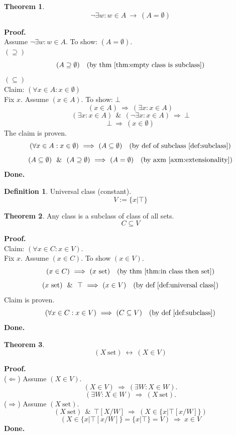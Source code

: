 \documentclass[10pt,a4paper]{article}
\theoremstyle{definition}
\newtheorem{definition}{Definition}[section]
\newtheorem{theorem}{Theorem}[section]
\newcommand{\AND}{\ \ \&\ \ }
\newcommand{\Done}{\noindent \textbf{Done.}\\}
\renewcommand{\iff}{\ \longleftrightarrow\ }
\newcommand{\IMPLIES}{\ \Longrightarrow\ }
\renewcommand{\implies}{\ \longrightarrow\ }
\newcommand{\Proof}{\noindent \textbf{Proof.}\\}
\newcommand{\set}{\mathrm{\ set}}
\newcommand{\comment}[1]{\quad\mbox{(#1)}}
\begin{document}
\begin{theorem}
\[
\neg\exists w: w\in A
\implies
(A=\emptyset)
\]
\end{theorem}
\Proof
Assume $\neg\exists w: w\in A$. To show: $(A=\emptyset)$.\\
$(\supseteq)$\\
\[
(A\supseteq\emptyset)
\quad\mbox{(by thm \ref{thm:empty class is subclass})}
\]
$(\subseteq)$\\
Claim: $(\forall x\in A:x\in\emptyset)$\\
Fix $x$. Assume $(x\in A)$. To show: $\bot$\\
\[
(x\in A)
\IMPLIES
(\exists x:x\in A)
\]
\[
(\exists x:x\in A)
\AND
(\neg\exists x:x\in A)
\IMPLIES
\bot
\]
\[
\bot
\IMPLIES
(x\in\emptyset)
\]
The claim is proven.
\[
(\forall x\in A:x\in\emptyset)
\IMPLIES
(A \subseteq \emptyset)
\comment{by def of subclass \ref{def:subclass}}
\]
\[
(A \subseteq \emptyset)
\AND
(A \supseteq \emptyset)
\IMPLIES
(A=\emptyset)
\comment{by axm \ref{axm:extensionality}}
\]
\Done


\begin{definition} Universal class (constant).
\label{def:universal class}
\[V:=\{x|\top\}\]
\end{definition}
\begin{theorem}
Any class is a subclass of class of all sets.
\[C\subseteq V\]
\end{theorem}
\Proof
Claim: $(\forall x\in C:x\in V)$.\\
Fix $x$. Assume $(x\in C)$. To show $(x\in V)$.
\[
(x\in C)
\IMPLIES
(x\set)
\quad\mbox{(by thm \ref{thm:in class then set})}
\]
\[
(x\set)
\AND
\top
\IMPLIES
(x\in V)
\quad\mbox{(by def \ref{def:universal class})}
\]
Claim is proven.
\[
(\forall x\in C:x\in V)
\IMPLIES
(C\subseteq V)
\quad\mbox{(by def \ref{def:subclass})}
\]
\Done

\begin{theorem}
\label{thm:sets are in V}
\[
(X\set)\iff(X\in V)
\]
\end{theorem}
\Proof
\noindent($\Leftarrow$) Assume $(X\in V)$.
\[
(X\in V)\IMPLIES(\exists W: X\in W).
\]
\[
(\exists W: X\in W)\IMPLIES(X\set).
\]
\noindent($\Rightarrow$) Assume $(X\set)$.
\[
(X\set)\AND\top[X/W]\IMPLIES(X\in \{x|\top[x/W]\})
\]
\[
(X\in \{x|\top[x/W]\}=\{x|\top\}=V)\IMPLIES x\in V
\]
\Done
\end{document}
